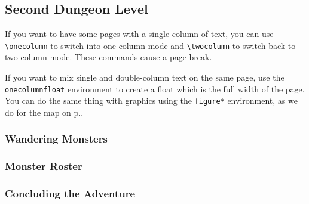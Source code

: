\documentclass[letterpaper,serif]{module}
\begin{document}
\begin{onecolumnfloat}[ht]
\part{Second Dungeon Level}

If you want to have some pages with a single column of text, you can use \verb|\onecolumn| to switch
into one-column mode and \verb|\twocolumn| to switch back to two-column mode. These commands cause
a page break.

If you want to mix single and double-column text on the same page, use the \verb|onecolumnfloat| environment
to create a float which is the full width of the page. You can do the same thing with graphics using
the \verb|figure*| environment, as we do for the map on p.\pageref{img:map}.

\section*{Wandering Monsters}
\label{wanderingmonsters}



\begin{wanderingmonsters}[b]
\end{wanderingmonsters}

\section*{Monster Roster}

\begin{monsterroster}
\end{monsterroster}
\end{onecolumnfloat}

\newpage

\lipsum[12-14]

\section{Concluding the Adventure}
\end{document}
